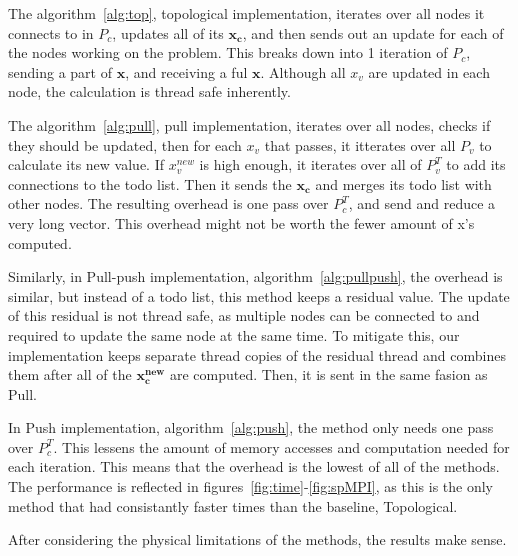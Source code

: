 \documentclass[letterpaper,11pt,onecolumn]{article}
\begin{document}
The algorithm~\ref{alg:top}, topological implementation, iterates over all nodes it connects to in $P_c$, updates all of its $\mathbf{x_c}$, and then sends out an update for each of the nodes working on the problem. This breaks down into 1 iteration of $P_c$, sending a part of $\mathbf{x}$, and receiving a ful $\mathbf{x}$. Although all $x_v$ are updated in each node, the calculation is thread safe inherently. 

The algorithm~\ref{alg:pull}, pull implementation, iterates over all nodes, checks if they should be updated, then for each $x_v$ that passes, it itterates over all $P_v$ to calculate its new value. If $x_v^{new}$ is high enough, it iterates over all of $P_v^T$ to add its connections to the todo list. Then it sends the $\mathbf{x_c}$ and merges its todo list with other nodes. The resulting overhead is one pass over $P_c^T$, and send and reduce a very long vector. This overhead might not be worth the fewer amount of x's computed. 

Similarly, in Pull-push implementation, algorithm~\ref{alg:pullpush}, the overhead is similar, but instead of a todo list, this method keeps a residual value. The update of this residual is not thread safe, as multiple nodes can be connected to and required to update the same node at the same time. To mitigate this, our implementation keeps separate thread copies of the residual thread and combines them after all of the $\mathbf{x_c^{new}}$ are computed. Then, it is sent in the same fasion as Pull. 

In Push implementation, algorithm~\ref{alg:push}, the method only needs one pass over $P_c^T$. This lessens the amount of memory accesses and computation needed for each iteration. This means that the overhead is the lowest of all of the methods. The performance is reflected in figures~\ref{fig:time}-\ref{fig:spMPI}, as this is the only method that had consistantly faster times than the baseline, Topological. 

After considering the physical limitations of the methods, the results make sense. 
\end{document}
